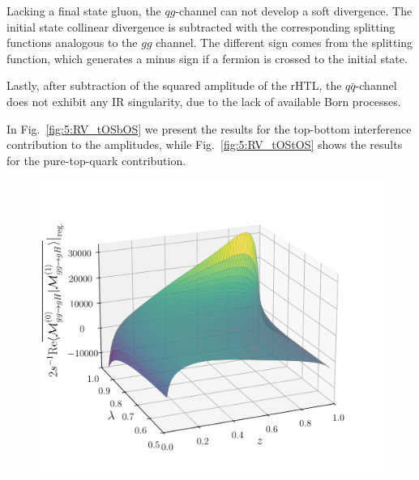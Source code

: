 Lacking a final state gluon, the $q g$-channel can not develop a soft divergence. The initial state collinear divergence is subtracted with the corresponding splitting functions analogous to the $gg$ channel. The different sign comes from the splitting function, which generates a minus sign if a fermion is crossed to the initial state.

Lastly, after subtraction of the squared amplitude of the \acs{rHTL}, the $q \bar{q}$-channel does not exhibit any \acs{IR} singularity, due to the lack of available Born processes.

In Fig.~\ref{fig:5:RV_tOSbOS} we present the results for the top-bottom interference contribution to the amplitudes, while Fig.~\ref{fig:5:RV_tOStOS} shows the results for the pure-top-quark contribution.
\begin{figure}[h]
  \begin{minipage}[t]{0.49\textwidth}
  \centering
  \includegraphics[width=\textwidth]{Images/RV_amplitudes/tOSbOS_gg.pdf}
  \end{minipage}
  \begin{minipage}[t]{0.49\textwidth}
  \centering

\end{minipage}
\end{figure}
